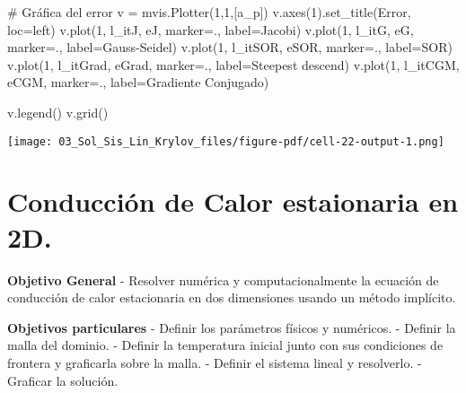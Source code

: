 \documentclass[
  letterpaper,
  DIV=11,
  numbers=noendperiod]{scrreprt}
\newenvironment{Shaded}{\begin{snugshade}}{\end{snugshade}}
\newcommand{\CommentTok}[1]{\textcolor[rgb]{0.37,0.37,0.37}{#1}}
\newcommand{\DecValTok}[1]{\textcolor[rgb]{0.68,0.00,0.00}{#1}}
\newcommand{\NormalTok}[1]{\textcolor[rgb]{0.00,0.23,0.31}{#1}}
\newcommand{\OperatorTok}[1]{\textcolor[rgb]{0.37,0.37,0.37}{#1}}
\newcommand{\StringTok}[1]{\textcolor[rgb]{0.13,0.47,0.30}{#1}}
\begin{document}
\begin{Shaded}
\begin{Highlighting}[]
\CommentTok{\# Gráfica del error}
\NormalTok{v }\OperatorTok{=}\NormalTok{ mvis.Plotter(}\DecValTok{1}\NormalTok{,}\DecValTok{1}\NormalTok{,[a\_p]) }
\NormalTok{v.axes(}\DecValTok{1}\NormalTok{).set\_title(}\StringTok{\textquotesingle{}Error\textquotesingle{}}\NormalTok{, loc}\OperatorTok{=}\StringTok{\textquotesingle{}left\textquotesingle{}}\NormalTok{)}
\NormalTok{v.plot(}\DecValTok{1}\NormalTok{, l\_itJ, eJ, marker}\OperatorTok{=}\StringTok{\textquotesingle{}.\textquotesingle{}}\NormalTok{, label}\OperatorTok{=}\StringTok{\textquotesingle{}Jacobi\textquotesingle{}}\NormalTok{)}
\NormalTok{v.plot(}\DecValTok{1}\NormalTok{, l\_itG, eG, marker}\OperatorTok{=}\StringTok{\textquotesingle{}.\textquotesingle{}}\NormalTok{, label}\OperatorTok{=}\StringTok{\textquotesingle{}Gauss{-}Seidel\textquotesingle{}}\NormalTok{)}
\NormalTok{v.plot(}\DecValTok{1}\NormalTok{, l\_itSOR, eSOR, marker}\OperatorTok{=}\StringTok{\textquotesingle{}.\textquotesingle{}}\NormalTok{, label}\OperatorTok{=}\StringTok{\textquotesingle{}SOR\textquotesingle{}}\NormalTok{)}
\NormalTok{v.plot(}\DecValTok{1}\NormalTok{, l\_itGrad, eGrad, marker}\OperatorTok{=}\StringTok{\textquotesingle{}.\textquotesingle{}}\NormalTok{, label}\OperatorTok{=}\StringTok{\textquotesingle{}Steepest descend\textquotesingle{}}\NormalTok{)}
\NormalTok{v.plot(}\DecValTok{1}\NormalTok{, l\_itCGM, eCGM, marker}\OperatorTok{=}\StringTok{\textquotesingle{}.\textquotesingle{}}\NormalTok{, label}\OperatorTok{=}\StringTok{\textquotesingle{}Gradiente Conjugado\textquotesingle{}}\NormalTok{)}

\NormalTok{v.legend()}
\NormalTok{v.grid()}
\end{Highlighting}
\end{Shaded}

\texttt{[image: 03\_Sol\_Sis\_Lin\_Krylov\_files/figure-pdf/cell-22-output-1.png]}


\chapter{Conducción de Calor estaionaria en
2D.}\label{conducciuxf3n-de-calor-estaionaria-en-2d.}

\textbf{Objetivo General} - Resolver numérica y computacionalmente la
ecuación de conducción de calor estacionaria en dos dimensiones usando
un método implícito.

\textbf{Objetivos particulares} - Definir los parámetros físicos y
numéricos. - Definir la malla del dominio. - Definir la temperatura
inicial junto con sus condiciones de frontera y graficarla sobre la
malla. - Definir el sistema lineal y resolverlo. - Graficar la solución.
\end{document}
